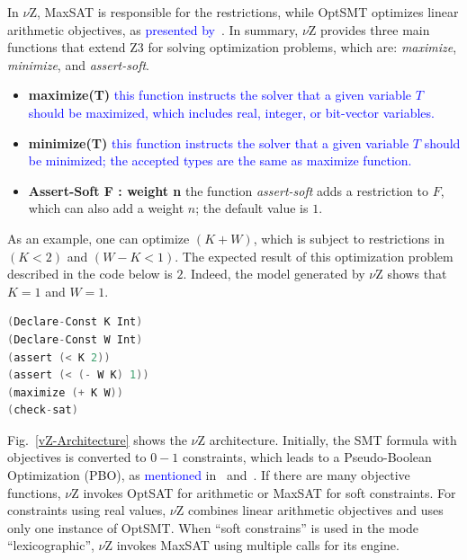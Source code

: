 \documentclass{doublecol-new}
\theoremstyle{TH}{
\newtheorem{lemma}{Lemma}
\newtheorem{theorem}[lemma]{Theorem}
\newtheorem{corrolary}[lemma]{Corrolary}
\newtheorem{conjecture}[lemma]{Conjecture}
\newtheorem{proposition}[lemma]{Proposition}
\newtheorem{claim}[lemma]{Claim}
\newtheorem{stheorem}[lemma]{Wrong Theorem}
\newtheorem{algorithm}{Algorithm}
}
\theoremstyle{THrm}{
\newtheorem{definition}{Definition}[section]
\newtheorem{question}{Question}[section]
\newtheorem{remark}{Remark}
\newtheorem{scheme}{Scheme}
}
\theoremstyle{THhit}{
\newtheorem{case}{Case}[section]
}
\begin{document}
In $\nu$Z, MaxSAT is responsible for the restrictions, while OptSMT optimizes linear arithmetic objectives, as \textcolor{blue}{presented by}~\cite{Bjorner2015}. In summary, $\nu$Z provides three main functions that extend Z3 for solving optimization problems, which are: \textit{maximize}, \textit{minimize}, and \textit{assert-soft}.

\begin{itemize}
\item{\textbf{maximize(T)}
\textcolor{blue}{this function instructs the solver that a given variable $T$ should be maximized, which includes real, integer, or bit-vector variables.}}
\item{\textbf{minimize(T)}
\textcolor{blue}{this function instructs the solver that a given variable $T$ should be minimized; the accepted types are the same as maximize function.}}
\item{\textbf{Assert-Soft F : weight n}
the function \textit{assert-soft} adds a restriction to $F$, which can also add a weight $n$; the default value is $1$.}
\end{itemize}

As an example, one can optimize $\left(K + W\right)$, which is subject to restrictions in $\left(K < 2\right)$ and $\left(W - K < 1\right)$. The expected result of this optimization problem described in the code below is $2$. Indeed, the model generated by $\nu$Z shows that $K = 1$ and $W = 1$.

\begin{lstlisting}[basicstyle=\footnotesize,language=C,caption={OpenMP basic Example.},label={vZ},numbersep=7pt,frame=tb,captionpos=t,numberstyle=\tiny]
(Declare-Const K Int) 
(Declare-Const W Int)
(assert (< K 2)) 
(assert (< (- W K) 1))
(maximize (+ K W)) 
(check-sat)
\end{lstlisting}

\vspace{2 mm}
Fig.~\ref{vZ-Architecture} shows the $\nu$Z architecture. Initially, the SMT formula with objectives is converted to $0-1$ constraints, which leads to a Pseudo-Boolean Optimization (PBO), as \textcolor{blue}{mentioned} in~\cite{Barth1995} and~\cite{Vasco2005}. If there are many objective functions, $\nu$Z invokes OptSAT for arithmetic or MaxSAT for soft constraints. For constraints using real values, $\nu$Z combines linear arithmetic objectives and uses only one instance of OptSMT. When ``soft constrains'' is used in the mode ``lexicographic'', $\nu$Z invokes MaxSAT using multiple calls for its engine.
\end{document}
